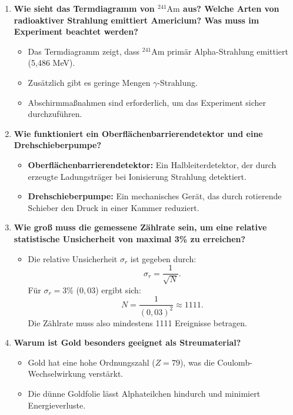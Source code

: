\documentclass[a4paper,12pt]{article}
\begin{document}
\begin{enumerate}
\begin{itemize}
    \end{itemize}

    \item \textbf{Wie sieht das Termdiagramm von \(^{241}\mathrm{Am}\) aus? Welche Arten von radioaktiver Strahlung emittiert Americium? Was muss im Experiment beachtet werden?}
    \begin{itemize}
        \item Das Termdiagramm zeigt, dass \(^{241}\mathrm{Am}\) primär Alpha-Strahlung emittiert (5,486 MeV).
        \item Zusätzlich gibt es geringe Mengen $\gamma$-Strahlung.
        \item Abschirmmaßnahmen sind erforderlich, um das Experiment sicher durchzuführen.
    \end{itemize}

    \item \textbf{Wie funktioniert ein Oberflächenbarrierendetektor und eine Drehschieberpumpe?}
    \begin{itemize}
        \item \textbf{Oberflächenbarrierendetektor:} Ein Halbleiterdetektor, der durch erzeugte Ladungsträger bei Ionisierung Strahlung detektiert.
        \item \textbf{Drehschieberpumpe:} Ein mechanisches Gerät, das durch rotierende Schieber den Druck in einer Kammer reduziert.
    \end{itemize}

    \item \textbf{Wie groß muss die gemessene Zählrate sein, um eine relative statistische Unsicherheit von maximal 3\% zu erreichen?}
    \begin{itemize}
        \item Die relative Unsicherheit $\sigma_r$ ist gegeben durch:
        \[
        \sigma_r = \frac{1}{\sqrt{N}}.
        \]
        Für $\sigma_r = 3\%$ ($0,03$) ergibt sich:
        \[
        N = \frac{1}{(0,03)^2} \approx 1111.
        \]
        Die Zählrate muss also mindestens 1111 Ereignisse betragen.
    \end{itemize}

    \item \textbf{Warum ist Gold besonders geeignet als Streumaterial?}
    \begin{itemize}
        \item Gold hat eine hohe Ordnungszahl ($Z = 79$), was die Coulomb-Wechselwirkung verstärkt.
        \item Die dünne Goldfolie lässt Alphateilchen hindurch und minimiert Energieverluste.
    \end{itemize}
\end{enumerate}
\end{document}
